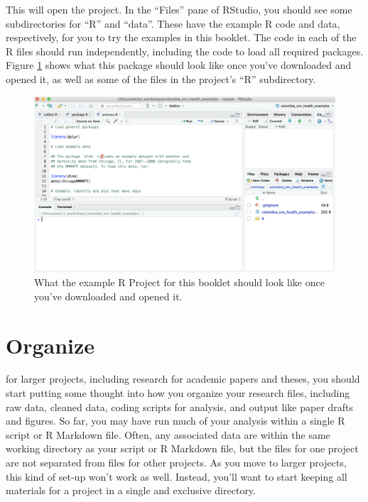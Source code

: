 \documentclass[]{tufte-book}
\begin{document}
This will open the project. In the ``Files'' pane of RStudio, you should see some subdirectories for
``R'' and ``data''. These have the example R code and data, respectively, for you to try the examples
in this booklet. The code in each of the R files should run independently, including the code to
load all required packages. Figure \ref{fig:examplerepo} shows what this package should
look like once you've downloaded and opened it, as well as some of the files in the
project's ``R'' subdirectory.

\begin{figure}
\includegraphics[width=28.86in]{images/example_repo} \caption[What the example R Project for this booklet should look like once you've downloaded and opened it]{What the example R Project for this booklet should look like once you've downloaded and opened it.}\label{fig:examplerepo}
\end{figure}

\hypertarget{organize}{%
\chapter{Organize}\label{organize}}

 for larger projects, including
research for academic papers and theses, you should start putting some thought
into how you organize your research files, including raw data, cleaned data,
coding scripts for analysis, and output like paper drafts and figures. So far,
you may have run much of your analysis within a single R script or R Markdown
file. Often, any associated data are within the same working directory as your
script or R Markdown file, but the files for one project are not separated from
files for other projects. As you move to larger projects, this kind of set-up
won't work as well. Instead, you'll want to start keeping all materials for a
project in a single and exclusive directory.
\end{document}
